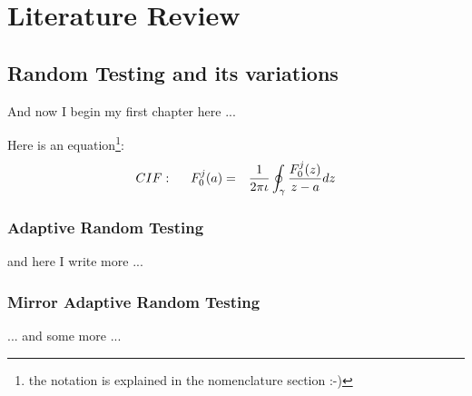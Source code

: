 
\chapter{Literature Review}
\ifpdf
    \graphicspath{{Chapter2/Chapter2Figs/PNG/}{Chapter2/Chapter2Figs/PDF/}{Chapter2/Chapter2Figs/}}
\else
    \graphicspath{{Chapter2/Chapter2Figs/EPS/}{Chapter2/Chapter2Figs/}}
\fi

\section{Random Testing and its variations}
And now I begin my first chapter here ...

Here is an equation\footnote{the notation is explained in the nomenclature section :-)}:
\begin{eqnarray}
CIF: \hspace*{5mm}F_0^j(a) &=& \frac{1}{2\pi \iota} \oint_{\gamma} \frac{F_0^j(z)}{z - a} dz
\end{eqnarray}
\nomenclature[gp]{$\pi$}{ $\simeq 3.14\ldots$}                                             %

\subsection{Adaptive Random Testing}
and here I write more ...\cite{texbook}

\subsection{Mirror Adaptive Random Testing}
... and some more ...

